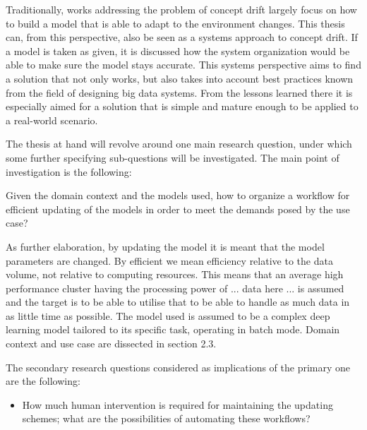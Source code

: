 Traditionally, works addressing the problem of concept drift largely focus on how to build a model that is able to adapt to the environment changes. This thesis can, from this perspective, also be seen as a systems approach to concept drift. If a model is taken as given, it is discussed how the system organization would be able to make sure the model stays accurate. This systems perspective aims to find a solution that not only works, but also takes into account best practices known from the field of designing big data systems. From the lessons learned there it is especially aimed for a solution that is simple and mature enough to be applied to a real-world scenario.




The thesis at hand will revolve around one main research question, under which some further specifying sub-questions will be investigated. The main point of investigation is the following:

\begin{center}
    Given the domain context and the models used, how to organize a workflow for efficient updating of the models in order to meet the demands posed by the use case?
\end{center}

As further elaboration, by updating the model it is meant that the model parameters are changed. By efficient we mean efficiency relative to the data volume, not relative to computing resources. This means that an average high performance cluster having the processing power of ... data here ... is assumed and the target is to be able to utilise that to be able to handle as much data in as little time as possible. The model used is assumed to be a complex deep learning model tailored to its specific task, operating in batch mode. Domain context and use case are dissected in section 2.3.

The secondary research questions considered as implications of the primary one are the following:

\begin{itemize}
    \item How much human intervention is required for maintaining the updating schemes; what are the possibilities of automating these workflows?
\end{itemize}

